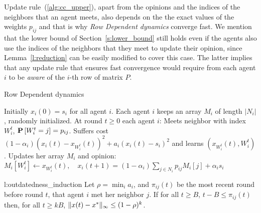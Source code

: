 \begin{remark}
  Update rule~(\ref{alg:cc_upper}), apart from the opinions
  and the indices of the neighbors that an agent meets,
  also depends on the the exact values of the weights $p_{ij}$ and that is
  why \emph{Row Dependent dynamics} converge fast. We mention that the lower bound of
  Section~\ref{s:lower_bound} still holds even if the agents also use the indices
  of the neighbors that they meet to update their opinion, since
  Lemma~\ref{l:reduction} can be easily modified to
  cover this case. The latter implies that any update rule that
  ensures fast convergence would require from each agent
  $i$ to be \emph{aware} of the $i$-th row of matrix $P$.

\end{remark}
\vspace{-5mm}
\begin{algorithm*}
  \caption{Row Dependent dynamics}
  \label{alg:influence_dependent}
  \begin{algorithmic}[1]
    \STATE Initially $x_i(0) = s_i$ for all agent $i$.
    \STATE Each agent $i$ keeps an array $M_i$ of length $|N_i|$,
    randomly initialized.
    \STATE At round $t\geq 0$ each agent $i$:
    \bindent
    \STATE Meets neighbor with index $W_i^t$, $\bm{\mathrm{P}}\left[W_i^t=j\right]=p_{ij}$.
    \STATE Suffers cost \((1-\alpha_i) (x_i(t) - x_{W_i^t}(t))^2 + a_i (x_i(t) - s_i)^2\)
    and learns $(x_{W_i^t}(t),W_i^t)$.
    \STATE Updates her array $M_i$ and opinion:
    $
    M_i[W_i^t] \gets x_{W_i^t}(t),\quad
    x_i(t+1) = (1-\alpha_i)\sum_{j \in N_i} p_{ij} M_i[j] + \alpha_i s_i
    $
    \eindent
  \end{algorithmic}
\end{algorithm*}

\begin{replemma}{l:outdatedness_induction}
  Let $\rho = \min_i a_i$, and $\pi_{ij}(t)$ be the most recent round
  before round $t$, that agent $i$ met her neighbor $j$.
  If for all $t\geq B$, $t-B \leq \pi_{ij}(t)$ then, for
  all $t \geq k B$,
  \(\| x(t) - x^* \|_{\infty} \leq (1-\rho)^k\).
\end{replemma}

